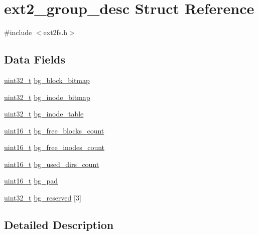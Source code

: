 \hypertarget{structext2__group__desc}{\section{ext2\-\_\-group\-\_\-desc \-Struct \-Reference}
\label{structext2__group__desc}
}


{\ttfamily \#include $<$ext2fs.\-h$>$}

\subsection*{\-Data \-Fields}
\begin{DoxyCompactItemize}
\item 
\hyperlink{types_8h_a435d1572bf3f880d55459d9805097f62}{uint32\-\_\-t} \hyperlink{structext2__group__desc_a57481ebe34986e28812cc9b4e122c016}{bg\-\_\-block\-\_\-bitmap}
\item 
\hyperlink{types_8h_a435d1572bf3f880d55459d9805097f62}{uint32\-\_\-t} \hyperlink{structext2__group__desc_a7ba3737304b14529a45aede6381aa968}{bg\-\_\-inode\-\_\-bitmap}
\item 
\hyperlink{types_8h_a435d1572bf3f880d55459d9805097f62}{uint32\-\_\-t} \hyperlink{structext2__group__desc_abf527c572a5fe30354cdf2cfc4f88b26}{bg\-\_\-inode\-\_\-table}
\item 
\hyperlink{types_8h_a273cf69d639a59973b6019625df33e30}{uint16\-\_\-t} \hyperlink{structext2__group__desc_af1cf7574780c76da67e973179f6edd43}{bg\-\_\-free\-\_\-blocks\-\_\-count}
\item 
\hyperlink{types_8h_a273cf69d639a59973b6019625df33e30}{uint16\-\_\-t} \hyperlink{structext2__group__desc_a5488cd2eb4ea863ca9d15a5df8da6bab}{bg\-\_\-free\-\_\-inodes\-\_\-count}
\item 
\hyperlink{types_8h_a273cf69d639a59973b6019625df33e30}{uint16\-\_\-t} \hyperlink{structext2__group__desc_adc9924671cb04dd63b4b7ffff8c262dc}{bg\-\_\-used\-\_\-dirs\-\_\-count}
\item 
\hyperlink{types_8h_a273cf69d639a59973b6019625df33e30}{uint16\-\_\-t} \hyperlink{structext2__group__desc_ac99983cee73aa4aace5c7d51b6d5a7e1}{bg\-\_\-pad}
\item 
\hyperlink{types_8h_a435d1572bf3f880d55459d9805097f62}{uint32\-\_\-t} \hyperlink{structext2__group__desc_aff7f7dc0b67aed284218b238991f5c93}{bg\-\_\-reserved} \mbox{[}3\mbox{]}
\end{DoxyCompactItemize}


\subsection{\-Detailed \-Description}


